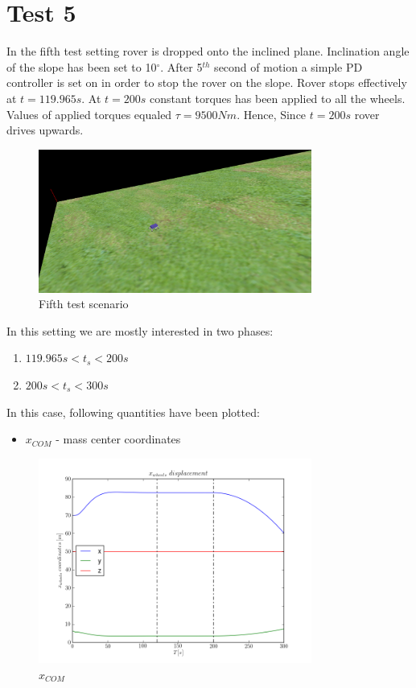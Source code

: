\newpage
\section{Test 5}
\label{Sec:test_5}

In the fifth test setting rover is dropped onto the inclined plane.
Inclination angle of the slope has been set to 10$^\circ$. After 5$^{th}$ second of motion a simple PD controller
is set on in order to stop the rover on the slope. Rover stops effectively at $t = 119.965s$. At $t = 200s$ constant torques has been applied to all the wheels.
Values of applied torques equaled $\tau = 9500Nm$. Hence, Since $t = 200s$ rover drives upwards. 

\begin{figure}[H]
  \centering
    \includegraphics[width=0.8\textwidth]{run_5}
  \caption{Fifth test scenario}
\end{figure}

\noindent  In this setting we are mostly interested in two phases:

\begin{enumerate} 
  \item $119.965s < t_s < 200s$
  \item $200s < t_s < 300s$
\end{enumerate}

\noindent In this case, following quantities have been plotted:

\begin{itemize}
  \item $x_{COM}$ - mass center coordinates
\end{itemize}

\begin{figure}[H]
  \centering
    \includegraphics[width=0.8\textwidth]{xCOM5}
  \caption{$x_{COM}$}
\end{figure}

